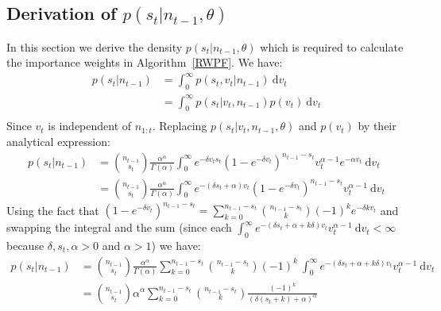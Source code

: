 \documentclass[12pt]{article}
\begin{document}
\begin{appendices}
	\subsection{Derivation of $p(s_t|n_{t-1}, \theta)$} \label{sDensity}
	In this section we derive the density $p(s_t|n_{t-1}, \theta)$ which is required to calculate the importance weights in Algorithm~\ref{RWPF}.
	We have:
	\begin{align*}
	p(s_t | n_{t-1}) & = \int_{0}^{\infty}p(s_t, v_t | n_{t-1})\ \mathrm{d}v_t \\
	& = \int_{0}^{\infty}p(s_t | v_t, n_{t-1})p(v_t)\ \mathrm{d}v_t \\
	\end{align*}
	Since $v_t$ is independent of $n_{1:t}$.
	Replacing $p(s_t | v_t, n_{t-1}, \theta)$ and $p(v_t)$ by their analytical expression:
	\begin{align*}
	p(s_t | n_{t-1}) & = \binom{n_{t-1}}{s_t}\frac{\alpha^\alpha}{\Gamma(\alpha)} \int_{0}^{\infty}e^{-\delta v_t s_t}(1-e^{-\delta v_t})^{n_{t-1}-s_t}v_t^{\alpha-1}e^{-\alpha v_t}\ \mathrm{d}v_t \\
	& = \binom{n_{t-1}}{s_t}\frac{\alpha^\alpha}{\Gamma(\alpha)}\int_{0}^{\infty}e^{-(\delta s_t+\alpha)v_t }(1-e^{-\delta v_t})^{n_{t-1}-s_t}v_t^{\alpha-1}\ \mathrm{d}v_t
	\end{align*}
	Using the fact that $(1-e^{-\delta v_t})^{n_{t-1}-s_t} = \sum_{k=0}^{n_{t-1}-s_t}\binom{n_{t-1}-s_t}{k}(-1)^ke^{-\delta k v_t}$ and swapping the integral and the sum (since each $\int_{0}^{\infty}e^{-(\delta s_t+\alpha + k\delta)v_t }v_t^{\alpha-1}\ \mathrm{d}v_t < \infty$ because $\delta,  s_t, \alpha > 0$ and $\alpha > 1$) we have:
	\begin{align*}
	p(s_t | n_{t-1}) & = \binom{n_{t-1}}{s_t}\frac{\alpha^\alpha}{\Gamma(\alpha)}\sum_{k=0}^{n_{t-1}-s_t}\binom{n_{t-1}-s_t}{k}(-1)^k \ \int_{0}^{\infty}e^{-(\delta s_t+\alpha + k\delta)v_t }v_t^{\alpha-1}\ \mathrm{d}v_t \\
	& = \binom{n_{t-1}}{s_t}\alpha^\alpha\sum_{k=0}^{n_{t-1}-s_t}\binom{n_{t-1}-s_t}{k}\frac{(-1)^k}{(\delta(s_t+k)+\alpha)^\alpha}
	\end{align*}
	

\end{appendices}
\end{document}
